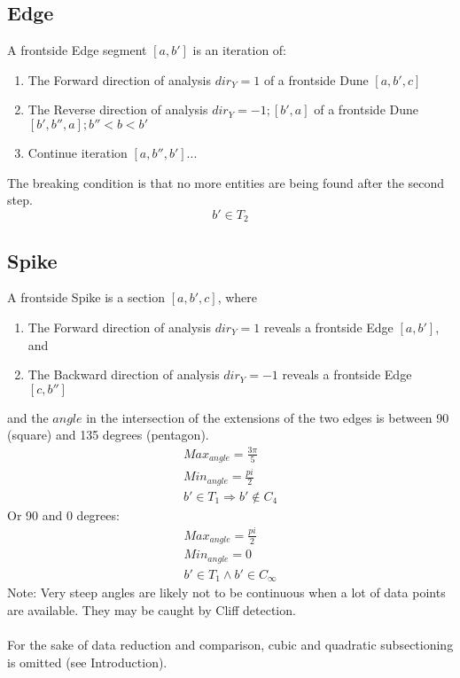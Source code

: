 \documentclass{report}
\begin{document}
\subsection{Edge}
A frontside Edge segment $[a,b']$ is an iteration of:
\begin{enumerate}
\item The Forward direction of analysis $dir_{Y}=1$ of a frontside Dune $[a,b',c]$
\item The Reverse direction of analysis $dir_{Y}=-1;[b',a]$ of a frontside Dune $[b',b'',a]; b''<b<b'$ 
\item Continue iteration $[a,b'',b']...$
\end{enumerate}
The breaking condition is that no more entities are being found after the second step.
\begin{equation}
b' \in T_{2}
\end{equation}

\subsection{Spike}
A frontside Spike is a section $[a,b',c]$, where
\begin{enumerate}
\item The Forward direction of analysis $dir_{Y}=1$ reveals a frontside Edge $[a,b']$, and
\item The Backward direction of analysis $dir_{Y}=-1$ reveals a frontside Edge $[c,b'']$ 
\end{enumerate}
and the $angle$ in the intersection of the extensions of the two edges is between 90 (square) and 135 degrees (pentagon).\\
\begin{align}
Max_{angle}=\frac{3\pi}{5}\\
Min_{angle}=\frac{pi}{2}\\
b' \in T_{1} \Rightarrow b' \not\in C_{4}
\end{align}
Or 90 and 0 degrees:
\begin{align}
Max_{angle}=\frac{pi}{2}\\
Min_{angle}=0\\
b' \in T_{1} \land b' \in C_{\infty}
\end{align}
Note: Very steep angles are likely not to be continuous when a lot of data points are available. They may be caught by Cliff detection.\\\\
For the sake of data reduction and comparison, cubic and quadratic subsectioning is omitted (see Introduction).
\end{document}
